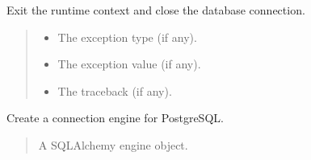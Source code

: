\documentclass[letterpaper,10pt,english]{sphinxmanual}
\begin{document}
\begin{fulllineitems}
\begin{fulllineitems}
\begin{quote}
\begin{description}
\sphinxAtStartPar
{\hyperref[\detokenize{src.database:src.database.postgres.PostgreSQLDB}]{}}

\end{description}\end{quote}

\end{fulllineitems}


\begin{fulllineitems}
\label{\detokenize{src.database:src.database.postgres.PostgreSQLDB.__exit__}}
\pysigstartsignatures
\pysiglinewithargsret
{}
{\sphinxparamcomma {}\sphinxparamcomma {}}
{}
\pysigstopsignatures
\sphinxAtStartPar
Exit the runtime context and close the database connection.
\begin{quote}\begin{description}
\begin{itemize}
\item {} 
\sphinxAtStartPar
{} \textendash{} The exception type (if any).

\item {} 
\sphinxAtStartPar
{} \textendash{} The exception value (if any).

\item {} 
\sphinxAtStartPar
{} \textendash{} The traceback (if any).

\end{itemize}

\end{description}\end{quote}

\end{fulllineitems}


\begin{fulllineitems}
\label{\detokenize{src.database:src.database.postgres.PostgreSQLDB._conn_postgres}}
\pysigstartsignatures
\pysiglinewithargsret
{}
{}
{}
\pysigstopsignatures
\sphinxAtStartPar
Create a connection engine for PostgreSQL.
\begin{quote}\begin{description}
\sphinxAtStartPar
A SQLAlchemy engine object.


\end{description}
\end{quote}
\end{fulllineitems}
\end{fulllineitems}
\end{document}
